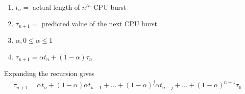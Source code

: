\documentclass[a4paper]{article}
\theoremstyle{plain}
\newtheorem{thm}{Theorem}[section]
\theoremstyle{definition}
\theoremstyle{remark}
\begin{document}
\begin{tcolorbox}[colback=black!3!white,colframe=black!60!white,title=\begin{thm}Exponential Moving Average \label{Exponential Moving Average}\end{thm}]
	\begin{enumerate}
		\item $t_n = $ actual length of $n^{th}$ CPU burst
		\item $\tau_{n+1}=$ predicted value of the next CPU burst
		\item $\alpha, 0\le \alpha\le 1$ 
		\item $\tau_{n+1} = \alpha t_n + (1-\alpha)\tau_n$
	\end{enumerate}
	Expanding the recursion gives
		\begin{align}
		\tau_{n+1} = \alpha t_n + (1-\alpha)\alpha t_{n-1} + \ldots + (1-\alpha)^{j}\alpha t_{n-j} + \ldots + (1-\alpha)^{n+1}\tau_0
		\end{align}
\end{tcolorbox}
\end{document}
